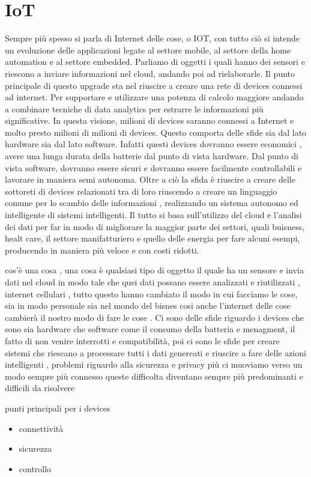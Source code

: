 \section{IoT}
Sempre più spesso si parla di Internet delle cose, o IOT, con tutto ciò si
intende un evoluzione delle applicazioni legate al settore mobile, al settore
della home automation e al settore embedded. Parliamo di oggetti i quali hanno
dei sensori e riescono a inviare informazioni nel cloud, andando poi ad
rielaborarle. 
Il punto principale di questo
upgrade sta nel riuscire a creare una rete di devices connessi ad internet. Per
supportare e utilizzare una potenza di calcolo maggiore andando a combinare
tecniche di data analytics per estrarre le informazioni più significative. 
In
questa visione, milioni di devices saranno connessi a Internet e molto presto
milioni di milioni di devices. 
Questo comporta delle sfide sia dal lato hardware sia dal lato software. Infatti
questi devices dovranno essere economici , avere una lunga durata della batterie
dal punto di vista hardware. Dal punto di vista software, dovranno essere sicuri
e dovranno essere facilmente controllabili e lavorare in maniera semi autonoma.
Oltre a ciò la  sfida è riuscire a creare delle sottoreti di devices relazionati tra di loro
riuscendo a creare un linguaggio comune per lo scambio delle informazioni ,
realizzando un sistema autonomo ed intelligente di sistemi intelligenti. Il
tutto si basa sull'utilizzo del cloud e l'analisi dei dati per far in modo di
migliorare la maggior parte dei settori, quali buisness, healt care, il
settore manifatturiero e quello delle energia per fare alcuni esempi, producendo
in maniera più veloce e con costi ridotti. 

cos'è una cosa , una cosa è qualsiasi tipo di oggetto il quale ha un sensore e
invia dati nel cloud in modo tale che quei dati possano essere analizzati e
riutilizzati , internet cellulari , tutto questo hanno cambiato il modo in cui
facciamo le cose, sia in modo personale sia nel mondo del bisnes  cosi anche
l'internet delle cose cambierà il nostro modo di fare le cose . Ci sono delle
sfide riguardo i devices che sono sia hardware che software come il consumo
della batteria e menagment, il fatto di non venire interrotti e compatibilità,
poi ci sono le sfide per creare sistemi che riescano a processare tutti i dati
genereati e riuscire a fare delle azioni intelligenti , problemi riguardo alla
sicurezza e privacy più ci muoviamo verso un modo sempre più connesso queste
difficolta diventano sempre più predominanti e difficili da risolvere

punti principali per i devices
\begin{itemize}
\item connettività
\item sicurezza
\item controllo
\end{itemize}
